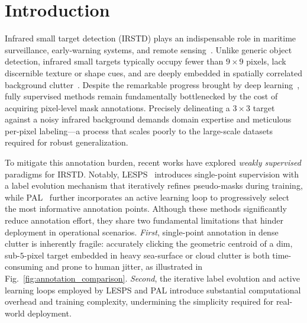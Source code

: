 
\section{Introduction}\label{sec:intro}

Infrared small target detection (IRSTD) plays an indispensable role in maritime
surveillance, early-warning systems, and remote sensing~\cite{dnanet,uiunet,alcnet}.
Unlike generic object detection, infrared small targets typically occupy fewer than
$9\times9$ pixels, lack discernible texture or shape cues, and are deeply embedded
in spatially correlated background clutter~\cite{irstd_survey}.
Despite the remarkable progress brought by deep learning~\cite{dnanet,uiunet,sctransnet},
fully supervised methods remain fundamentally bottlenecked by the cost of acquiring
pixel-level mask annotations.
Precisely delineating a $3\times3$ target against a noisy infrared background demands
domain expertise and meticulous per-pixel labeling---a process that scales poorly to
the large-scale datasets required for robust generalization.

To mitigate this annotation burden, recent works have explored \emph{weakly supervised}
paradigms for IRSTD.
Notably, LESPS~\cite{lesps} introduces single-point supervision with a label evolution
mechanism that iteratively refines pseudo-masks during training, while PAL~\cite{pal}
further incorporates an active learning loop to progressively select the most informative
annotation points.
Although these methods significantly reduce annotation effort, they share two fundamental
limitations that hinder deployment in operational scenarios.
\emph{First}, single-point annotation in dense clutter is inherently fragile: accurately
clicking the geometric centroid of a dim, sub-$5$-pixel target embedded in heavy
sea-surface or cloud clutter is both time-consuming and prone to human jitter, as
illustrated in Fig.~\ref{fig:annotation_comparison}.
\emph{Second}, the iterative label evolution and active learning loops employed by LESPS
and PAL introduce substantial computational overhead and training complexity, undermining
the simplicity required for real-world deployment.

